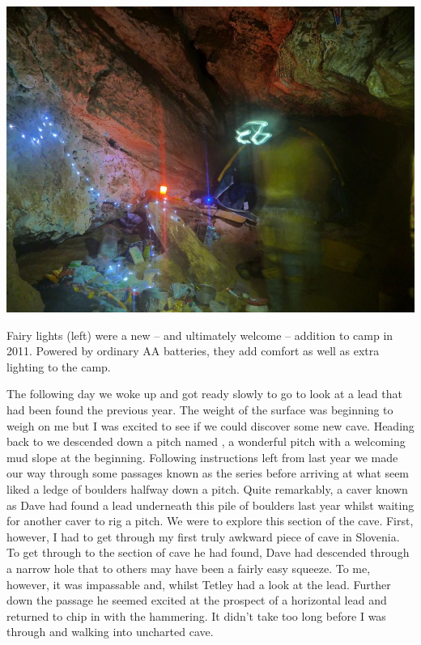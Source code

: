 

\begin{pagefigure}
\checkoddpage \ifoddpage \forcerectofloat \else \forceversofloat \fi
   \centering
\includegraphics[width = \textwidth]{2011/alex_pitcher_award/2011-08-03-10.32.46-Grega-Panasonc DMC-FT2-106-camp x-ray--orig_1050p.jpg}
\caption{Fairy lights (left) were a new -- and ultimately welcome -- addition to camp  in 2011. Powered by ordinary AA batteries, they add comfort as well as extra lighting to the camp. } \label{fairy lights camp}
\end{pagefigure}



The following day we woke up and got ready slowly to go to look at a
lead that had been found the previous year. The weight of the surface
was beginning to weigh on me but I was excited to see if we could
discover some new cave. Heading back to  we descended down
a pitch named , a wonderful pitch with a welcoming mud
slope at the beginning. Following instructions left from last year we
made our way through some passages known as the  series
before arriving at what seem liked a ledge of boulders halfway down a
pitch. Quite remarkably, a caver known as Dave had found a lead
underneath this pile of boulders last year whilst waiting for another
caver to rig a pitch. We were to explore this section of the cave.
First, however, I had to get through my first truly awkward piece of
cave in Slovenia. To get through to the section of cave he had found,
Dave had descended through a narrow hole that to others may have been a
fairly easy squeeze. To me, however, it was impassable and,  whilst Tetley had
a look at the lead. Further down the passage he seemed excited at the
prospect of a horizontal lead and returned to chip in with the
hammering. It didn't take too long before I was through and walking into
uncharted cave.

